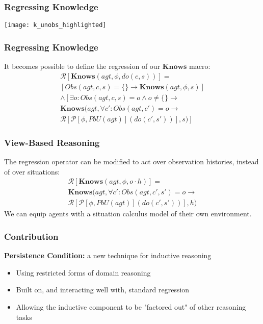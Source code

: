 \documentclass{beamer}
\begin{document}
\begin{frame}
\frametitle{Regressing Knowledge}
\begin{center}
  \texttt{[image: k\_unobs\_highlighted]}
\end{center}
\end{frame}

\begin{frame}
\frametitle{Regressing Knowledge}
It becomes possible to define the regression of our $\mathbf{Knows}$ macro:
\begin{multline*}
  \mathcal{R}[\mathbf{Knows}(agt,\phi,do(c,s))] = \\
     \left[ Obs(agt,c,s) = \{\} \rightarrow \mathbf{Knows}(agt,\phi,s) \right] \\
     \wedge \left[ \exists o : Obs(agt,c,s) = o \wedge o\neq \{\} \rightarrow \right. \\
     \mathbf{Knows}(agt,\forall c' : Obs(agt,c')=o \rightarrow \\
     \left.\mathcal{R}[\mathcal{P}[\phi,PbU(agt)](do(c',s'))],s)\right]
\end{multline*}
\end{frame}

\begin{frame}
\frametitle{View-Based Reasoning}
The regression operator can be modified to act over observation histories,
instead of over situations:
\begin{multline*}
  \mathcal{R}[\mathbf{Knows}(agt,\phi,o \cdot h)] = \\
  \mathbf{Knows}(agt,\forall c' : Obs(agt,c',s')=o \rightarrow \\
     \mathcal{R}[\mathcal{P}[\phi,PbU(agt)](do(c',s'))],h)
\end{multline*}
We can equip agents with a situation calculus model of their own environment.
\end{frame}


\begin{frame}
\frametitle{Contribution}
\textbf{Persistence Condition:}  a new technique for inductive reasoning
\begin{itemize}
\item Using restricted forms of domain reasoning
\item Built on, and interacting well with, standard regression
\item Allowing the inductive component to be "factored out" of other reasoning tasks
\end{itemize}
\end{frame}
\end{document}
